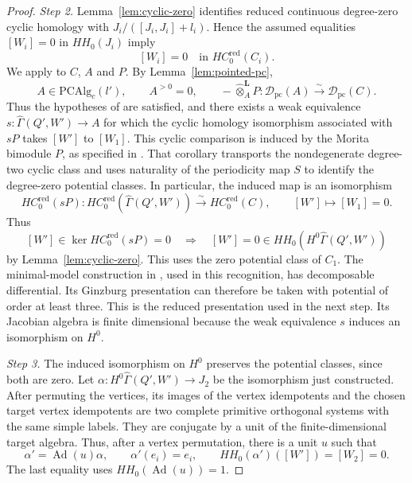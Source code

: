 \documentclass[12pt,a4paper,english,reqno]{amsart}
\theoremstyle{plain}
\theoremstyle{definition}
\numberwithin{equation}{section}
\newcommand{\lemref}[1]{Lemma~\ref{#1}}
\def\al{\alpha}
\def\Ga{\Gamma}
\def\calD{{\mathcal D}}
\def\ox{\otimes}
\def\ya#1{\xrightarrow{#1}}
\begin{document}
\begin{proof}
\medskip\noindent\emph{Step 2.}
\lemref{lem:cyclic-zero} identifies reduced continuous degree-zero cyclic homology with $J_i/([J_i,J_i]+l_i)$. Hence the assumed equalities $[W_i]=0$ in $HH_0(J_i)$ imply
\[
 [W_i]=0\quad\text{in }HC^{\mathrm{red}}_0(C_i).
\]
We apply \cite[Corollary 4.27]{HK} to $C$, $A$ and $P$. By \lemref{lem:pointed-pc},
\[
 A\in\mathrm{PCAlg}_c(l'),\qquad A^{>0}=0,\qquad
 -\widehat\ox_A^{\mathbf L}P:
 \calD_{\mathrm{pc}}(A)\ya{\sim}\calD_{\mathrm{pc}}(C).
\]
Thus the hypotheses of \cite[Corollary 4.27]{HK} are satisfied, and there exists a weak equivalence
$s:\widehat\Ga(Q',W')\to A$ for which the cyclic homology isomorphism associated with $sP$ takes $[W']$ to $[W_1]$. This cyclic comparison is induced by the Morita bimodule $P$, as specified in \cite[Corollary 4.27]{HK}. That corollary transports the nondegenerate degree-two cyclic class and uses naturality of the periodicity map $S$ to identify the degree-zero potential classes. In particular, the induced map is an isomorphism
\[
 HC^{\mathrm{red}}_0(sP):
 HC^{\mathrm{red}}_0(\widehat\Ga(Q',W'))
 \ya{\sim} HC^{\mathrm{red}}_0(C),
 \qquad [W']\longmapsto[W_1]=0.
\]
Thus
\[
 [W']\in\ker HC^{\mathrm{red}}_0(sP)=0
 \quad\Longrightarrow\quad
 [W']=0\in HH_0(H^0\widehat\Ga(Q',W'))
\]
by \lemref{lem:cyclic-zero}. This uses the zero potential class of $C_1$. The minimal-model construction in \cite[Theorem 11.2.1]{VdB}, used in this recognition, has decomposable differential. Its Ginzburg presentation can therefore be taken with potential of order at least three. This is the reduced presentation used in the next step. Its Jacobian algebra is finite dimensional because the weak equivalence $s$ induces an isomorphism on $H^0$.

\medskip\noindent\emph{Step 3.}
The induced isomorphism on $H^0$ preserves the potential classes, since both are zero. Let $\al:H^0\widehat\Ga(Q',W')\to J_2$ be the isomorphism just constructed. After permuting the vertices, its images of the vertex idempotents and the chosen target vertex idempotents are two complete primitive orthogonal systems with the same simple labels. They are conjugate by a unit of the finite-dimensional target algebra. Thus, after a vertex permutation, there is a unit $u$ such that
\[
 \al'=\operatorname{Ad}(u)\al,\qquad
 \al'(e_i)=e_i,\qquad
 HH_0(\al')([W'])=[W_2]=0.
\]
The last equality uses $HH_0(\operatorname{Ad}(u))=1$.


\end{proof}
\end{document}
